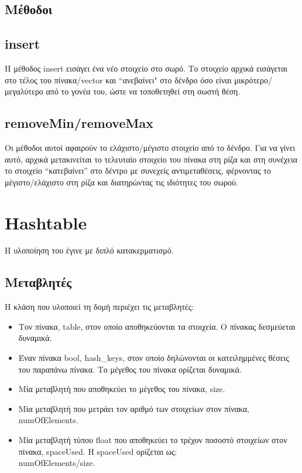 \documentclass[12pt,a4paper]{article}
\begin{document}
    \subsection*{Μέθοδοι}
    \subsection{insert}
    Η μέθοδος insert εισάγει ένα νέο στοιχείο στο σωρό. Το στοιχείο αρχικά εισάγεται στο τέλος του πίνακα/vector και ``ανεβαίνει" στο δένδρο όσο είναι μικρότερο/
    μεγαλύτερο από το γονέα του, ώστε να τοποθετηθεί στη σωστή θέση.
    \subsection{removeMin/removeMax}
    Οι μέθοδοι αυτοί αφαιρούν το ελάχιστο/μέγιστο στοιχείο από το δένδρο. Για να γίνει αυτό, αρχικά μετακινείται το τελευταίο στοιχείο του πίνακα στη ρίζα και στη 
    συνέχεια το στοιχείο ``κατεβαίνει'' στο δέντρο με συνεχείς αντιμεταθέσεις, φέρνοντας το μέγιστο/ελάχιστο στη ρίζα και διατηρώντας τις ιδιότητες του σωρού.
    \section{Hashtable}
    Η υλοποίηση του έγινε με διπλό κατακερματισμό.
    \subsection*{Μεταβλητές}
    Η κλάση που υλοποιεί τη δομή περιέχει τις μεταβλητές:
    \begin{itemize}
        \item Τον πίνακα, table, στον οποίο αποθηκεύονται τα στοιχεία. Ο πίνακας δεσμεύεται δυναμικά.
        \item Έναν πίνακα bool, hash\_keys, στον οποίο δηλώνονται οι κατειλημμένες θέσεις του παραπάνω πίνακα. Το μέγεθος του πίνακα ορίζεται δυναμικά.
        \item Μία μεταβλητή που αποθηκεύει το μέγεθος του πίνακα, size.
        \item Μία μεταβλητή που μετράει τον αριθμό των στοιχείων στον πίνακα, numOfElements.
        \item Μία μεταβλητή τύπου float που αποθηκεύει το τρέχον ποσοστό στοιχείων στον πίνακα, spaceUsed. Η spaceUsed ορίζεται ως:\\ numOfElements/size.
    \end{itemize}
\end{document}
